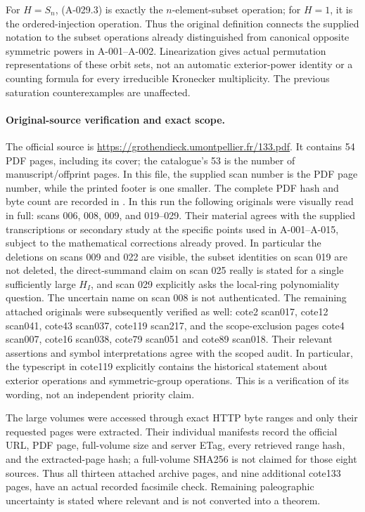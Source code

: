 For \(H=S_n\), (A-029.3) is exactly the \(n\)-element-subset
operation; for \(H=1\), it is the ordered-injection operation.
Thus the original definition connects the supplied notation to the
subset operations already distinguished from canonical opposite
symmetric powers in A-001--A-002. Linearization gives actual
permutation representations of these orbit sets, not an automatic
exterior-power identity or a counting formula for every irreducible
Kronecker multiplicity. The previous saturation counterexamples
are unaffected.

\paragraph{Original-source verification and exact scope.}
The official source is
\url{https://grothendieck.umontpellier.fr/133.pdf}. It contains
54 PDF pages, including its cover; the catalogue's 53 is the number
of manuscript/offprint pages. In this file, the supplied scan number
is the PDF page number, while the printed footer is one smaller.
The complete PDF hash and byte count are recorded in
.
In this run the following originals were visually read in full:
scans 006, 008, 009, and 019--029. Their material agrees with the
supplied transcriptions or secondary study at the specific points
used in A-001--A-015, subject to the mathematical corrections already
proved. In particular the deletions on scans 009 and 022 are visible,
the subset identities on scan 019 are not deleted, the direct-summand
claim on scan 025 really is stated for a single sufficiently large
\(H_I\), and scan 029 explicitly asks the local-ring polynomiality
question. The uncertain name on scan 008 is not authenticated.
The remaining attached originals were subsequently verified as well:
cote2 scan017, cote12 scan041, cote43 scan037, cote119 scan217,
and the scope-exclusion pages cote4 scan007, cote16 scan038,
cote79 scan051 and cote89 scan018. Their relevant assertions and
symbol interpretations agree with the scoped audit. In particular,
the typescript in cote119 explicitly contains the historical statement
about exterior operations and symmetric-group operations. This is a
verification of its wording, not an independent priority claim.

The large volumes were accessed through exact HTTP byte ranges and
only their requested pages were extracted. Their individual manifests
record the official URL, PDF page, full-volume size and server ETag,
every retrieved range hash, and the extracted-page hash; a full-volume
SHA256 is not claimed for those eight sources. Thus all thirteen
attached archive pages, and nine additional cote133 pages, have an
actual recorded facsimile check. Remaining paleographic uncertainty
is stated where relevant and is not converted into a theorem.

